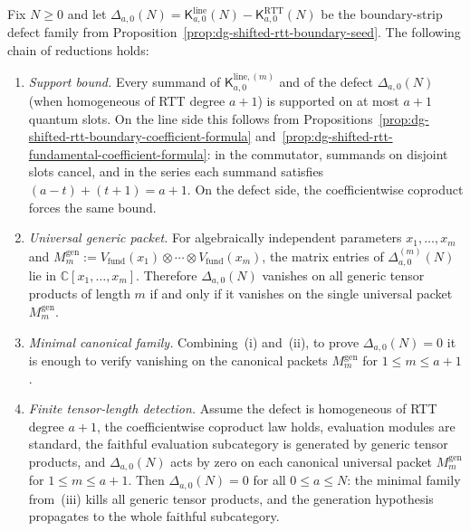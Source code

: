 \begin{proposition}
\label{prop:dg-shifted-rtt-boundary-support-bound}
\label{prop:dg-shifted-rtt-defect-support-mechanism}
\label{prop:dg-shifted-rtt-universal-generic-packets}
\label{prop:dg-shifted-rtt-minimal-canonical-family}
\label{prop:dg-shifted-rtt-finite-tensor-detection}
Fix $N \ge 0$ and let
$\Delta_{a,0}(N)
=\mathsf{K}^{\mathrm{line}}_{a,0}(N)
-\mathsf{K}^{\mathrm{RTT}}_{a,0}(N)$
be the boundary-strip defect family from
Proposition~\ref{prop:dg-shifted-rtt-boundary-seed}.
The following chain of reductions holds:
\begin{enumerate}[label=\textup{(\roman*)}]
\item \emph{Support bound.}
 Every summand of $\mathsf{K}^{\mathrm{line},(m)}_{a,0}$ and of the
 defect $\Delta_{a,0}(N)$ (when homogeneous of RTT degree $a+1$) is
 supported on at most $a+1$ quantum slots. On the line side this
 follows from
 Propositions~\ref{prop:dg-shifted-rtt-boundary-coefficient-formula}
 and~\ref{prop:dg-shifted-rtt-fundamental-coefficient-formula}: in the
 commutator, summands on disjoint slots cancel, and in the series
 each summand satisfies $(a-t)+(t+1)=a+1$. On the defect side, the
 coefficientwise coproduct forces the same bound.
\item \emph{Universal generic packet.}
 For algebraically independent parameters $x_1,\dots,x_m$ and
 $M_m^{\mathrm{gen}}
 :=V_{\mathrm{fund}}(x_1)\otimes\cdots\otimes V_{\mathrm{fund}}(x_m)$,
 the matrix entries of $\Delta^{(m)}_{a,0}(N)$ lie in
 $\mathbb{C}[x_1,\dots,x_m]$. Therefore $\Delta_{a,0}(N)$ vanishes
 on all generic tensor products of length $m$ if and only if it
 vanishes on the single universal packet $M_m^{\mathrm{gen}}$.
\item \emph{Minimal canonical family.}
 Combining~\textup{(i)} and~\textup{(ii)}, to prove
 $\Delta_{a,0}(N)=0$ it is enough to verify vanishing on the
 canonical packets $M_m^{\mathrm{gen}}$ for $1\le m\le a+1$.
\item \emph{Finite tensor-length detection.}
 Assume the defect is homogeneous of RTT degree $a+1$, the
 coefficientwise coproduct law holds, evaluation modules are standard,
 the faithful evaluation subcategory is generated by generic tensor
 products, and $\Delta_{a,0}(N)$ acts by zero on each canonical
 universal packet $M_m^{\mathrm{gen}}$ for $1\le m\le a+1$. Then
 $\Delta_{a,0}(N)=0$ for all $0 \le a \le N$: the minimal family
 from~\textup{(iii)} kills all generic tensor products, and the
 generation hypothesis propagates to the whole faithful subcategory.
\end{enumerate}
\end{proposition}

